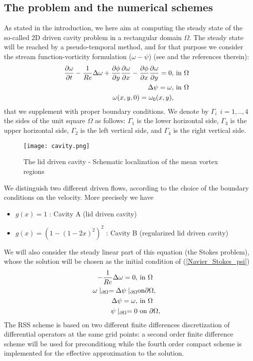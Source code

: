{\subsection{The problem and the numerical schemes}
As stated in the introduction, we here aim at computing the steady state of the so-called 2D driven cavity problem in a rectangular domain $\Omega$. 
The steady state will be reached by a pseudo-temporal method, and for that purpose we consider the stream function-vorticity formulation ($\omega-\psi$) (see \cite{PeyretTaylorBook,TemamNSE} and the references therein):
\begin{eqnarray}
\label{Navier_Stokes_psi}
\frac{\textstyle \partial \omega} {\textstyle \partial t}-\frac{\textstyle 1} {\textstyle Re}\Delta \omega
 +\frac{\textstyle \partial \phi} {\textstyle \partial y}
\frac{\textstyle \partial \omega} {\textstyle \partial x} - \frac{\textstyle \partial \phi} {\textstyle \partial
x}
\frac{\textstyle \partial \omega} {\textstyle \partial y}=0, & \mbox{ in }  \Omega\\
\Delta \psi =\omega, & \mbox{ in }   \Omega \\
\omega(x,y,0)=\omega_0(x,y),
\end{eqnarray}
that we supplement with proper boundary conditions. We denote by ${\Gamma}_{i} \
\ i=1,..,4$ the sides of the unit square $\Omega$ as follows:
${\Gamma}_{1}$ is the lower horizontal side, ${\Gamma}_{3}$ is the
upper horizontal side, ${\Gamma}_{2}$ is the left vertical side, and
${\Gamma}_{4}$ is the right vertical side.


\begin{figure}[ht!]
\begin{center}
\texttt{[image: cavity.png]}
\end{center}
\caption{The lid driven cavity - Schematic localization of the mean
vortex regions}
\end{figure}

We distinguish two different driven flows, according to the choice of
the boundary conditions on the velocity. More precisely we have
\begin{itemize}
\item $g(x)=1$ : Cavity A (lid driven cavity)
\item $g(x)=(1-(1-2x)^2)^2$ : Cavity B (regularized lid driven cavity)
\end{itemize}
We will also consider the steady  linear part of this equation (the Stokes problem), whose the solution will be chosen as the initial condition of (\ref{Navier_Stokes_psi})
\begin{eqnarray}
\label{Stokes_psi}
-\frac{\textstyle 1} {\textstyle Re}\Delta \omega=0, &\mbox{ in }  \Omega\\
\omega\mid_{\partial \Omega}=\Delta \psi \mid_{\partial \Omega} & \mbox{on} \partial \Omega,\\
\Delta \psi =\omega, &\mbox{ in } \Omega\\
\psi\mid_{\partial \Omega}=0 & \mbox{ on } \partial \Omega,
\end{eqnarray}
The RSS scheme is based on two different finite differences discretization of differential operators at the same grid points: a second order finite difference scheme will be used for preconditiong while the fourth order compact scheme is
implemented for the effective approximation to the solution.

}

